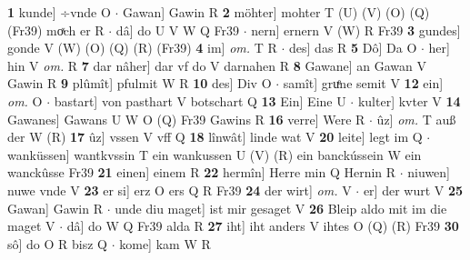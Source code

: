\documentclass[8pt,a4paper,notitlepage]{article}
\begin{document}
\begin{table}[ht]
\begin{minipage}[t]{0.5\linewidth}
\textbf{1} kunde] ÷vnde O  $\cdot$ Gawan] Gawin R \textbf{2} möhter] mohter T (U) (V) (O) (Q) (Fr39) moͯch er R  $\cdot$ dâ] do U V W Q Fr39  $\cdot$ nern] ernern V (W) R Fr39 \textbf{3} gundes] gonde V (W) (O) (Q) (R) (Fr39) \textbf{4} im] \textit{om.} T R  $\cdot$ des] das R \textbf{5} Dô] Da O  $\cdot$ her] hin V \textit{om.} R \textbf{7} dar nâher] dar vf do V darnahen R \textbf{8} Gawane] an Gawan V Gawin R \textbf{9} plûmît] pfulmit W R \textbf{10} des] Div O  $\cdot$ samît] gruͤne semit V \textbf{12} ein] \textit{om.} O  $\cdot$ bastart] von pasthart V botschart Q \textbf{13} Ein] Eine U  $\cdot$ kulter] kvter V \textbf{14} Gawanes] Gawans U W O (Q) Fr39 Gawins R \textbf{16} verre] Were R  $\cdot$ ûz] \textit{om.} T auß der W (R) \textbf{17} ûz] vssen V vff Q \textbf{18} lînwât] linde wat V \textbf{20} leite] legt im Q  $\cdot$ wanküssen] wantkvssin T ein wankussen U (V) (R) ein banckússein W ein wanckûsse Fr39 \textbf{21} einen] einem R \textbf{22} hermîn] Herre min Q Hernin R  $\cdot$ niuwen] nuwe vnde V \textbf{23} er si] erz O ers Q R Fr39 \textbf{24} der wirt] \textit{om.} V  $\cdot$ er] der wurt V \textbf{25} Gawan] Gawin R  $\cdot$ unde diu maget] ist mir gesaget V \textbf{26} Bleip aldo mit im die maget V  $\cdot$ dâ] do W Q Fr39 alda R \textbf{27} iht] iht anders V ihtes O (Q) (R) Fr39 \textbf{30} sô] do O R bisz Q  $\cdot$ kome] kam W R \newline
\end{minipage}
\end{table}
\end{document}
